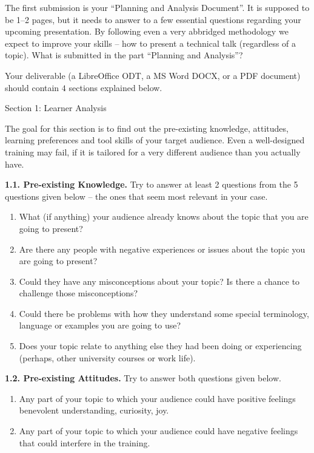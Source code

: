 \documentclass[jou]{apa6}
\begin{document}
The first submission is your “Planning and Analysis Document”. It is supposed 
to be 1--2 pages, but it needs to answer to a few essential questions regarding 
your upcoming presentation. By following even a very abbridged methodology 
we expect to improve your skills – how to present a technical talk (regardless of a topic). 
What is submitted in the part ``Planning and Analysis''?

Your deliverable (a LibreOffice ODT, a MS Word DOCX, or a PDF document) 
should contain $4$ sections explained below. 



\vspace{20pt}
{\large Section 1: Learner Analysis}

{\footnotesize The goal for this section is to find out the pre-existing knowledge, 
attitudes, learning preferences and tool skills of your target audience. 
Even a well-designed training may fail, if it is tailored 
for a very different audience than you actually have.}

{\bf 1.1.  Pre-existing Knowledge.} 
Try to answer at least 2 questions from the 5 questions given below – the ones that seem most relevant in your case.
\begin{enumerate}[(1)]
\item What (if anything) your audience already knows about the topic that you are going to present? 
\item Are there any people with negative experiences or issues about the topic you are going to present?
\item Could they have any misconceptions about your topic? Is there a chance to challenge those misconceptions?
\item Could there be problems with how they understand some special terminology, language or examples you are going to use? 
\item Does your topic relate to anything else they had been doing or experiencing (perhaps, other university courses or work life).
\end{enumerate}

{\bf 1.2. Pre-existing Attitudes.} Try to answer both questions given below.
\begin{enumerate}[(1)]
\item Any part of your topic to which your audience could have 
positive feelings \textendash{} benevolent understanding, curiosity, joy.
\item Any part of your topic to which your audience could have 
negative feelings that could interfere in the training.
\end{enumerate}
\end{document}
